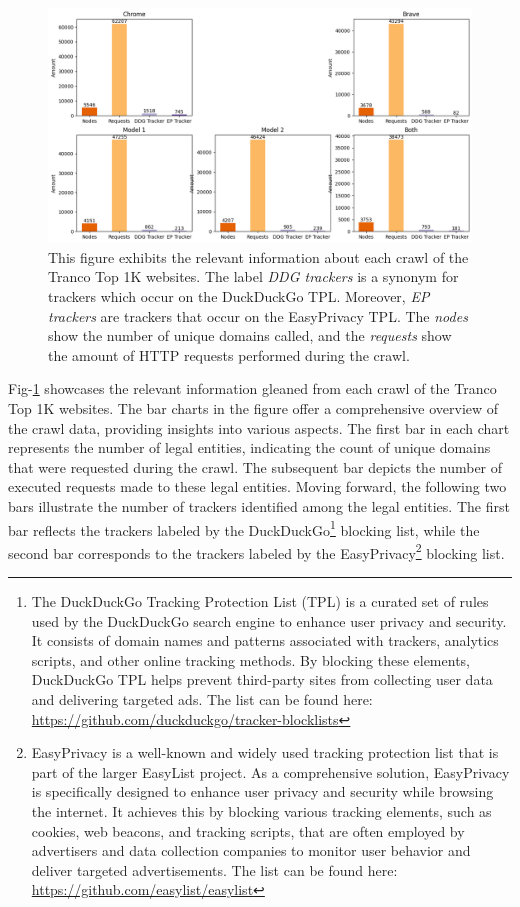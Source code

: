 \begin{figure}[ht!]  
  \centering
      \includegraphics[width=\linewidth, keepaspectratio]{images/CrawlPlot.png}
  \caption{This figure exhibits the relevant information about each crawl of the Tranco Top 1K websites. The label \emph{DDG trackers}
    is a synonym for trackers which occur on the DuckDuckGo TPL. Moreover, \emph{EP trackers} are trackers that occur on the EasyPrivacy TPL. The \emph{nodes} show
  the number of unique domains called, and the \emph{requests} show the amount of HTTP requests performed during the crawl.}
  \label{fig:CrawlPlot}
\end{figure}
Fig-\ref{fig:CrawlPlot} showcases the relevant information gleaned from each crawl of the Tranco Top 1K websites. The bar charts in
the figure offer a comprehensive overview of the crawl data, providing insights into various aspects. The first bar in each
chart represents the number of legal entities, indicating the count of unique domains that were requested during the crawl.
The subsequent bar depicts the number of executed requests made to these legal entities. Moving forward, the following two bars
illustrate the number of trackers identified among the legal entities. The first bar reflects the trackers labeled by the DuckDuckGo\footnote{The DuckDuckGo Tracking Protection List (TPL) is a curated set of rules used by the DuckDuckGo search engine to enhance user privacy and security. It consists of domain names and patterns associated with trackers, analytics scripts, and other online tracking methods. By blocking these elements, DuckDuckGo TPL helps prevent third-party sites from collecting user data and delivering targeted ads. The list can be found here: \url{https://github.com/duckduckgo/tracker-blocklists}}
blocking list, while the second bar corresponds to the trackers labeled by the EasyPrivacy\footnote{EasyPrivacy is a well-known and widely used tracking protection list that is part of the larger EasyList project. As a comprehensive solution, EasyPrivacy is specifically designed to enhance user privacy and security while browsing the internet. It achieves this by blocking various tracking elements, such as cookies, web beacons, and tracking scripts, that are often employed by advertisers and data collection companies to monitor user behavior and deliver targeted advertisements. The list can be found here: \url{https://github.com/easylist/easylist}} blocking list.

